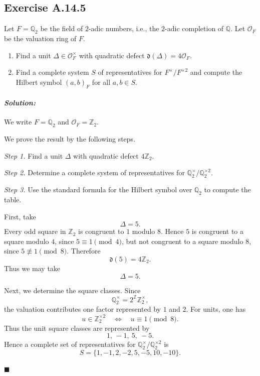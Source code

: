 \documentclass[12pt, a4paper]{article}
\newenvironment{solution}
  {\paragraph{\textit{Solution:}}\par\medskip}
  {\hfill$\blacksquare$\vspace{0.1cm}}
\begin{document}
\subsection*{Exercise A.14.5}
Let $F = \mathbb{Q}_2$ be the field of $2$-adic numbers, i.e., the $2$-adic completion of $\mathbb{Q}$. Let $\mathcal{O}_F$ be the valuation ring of $F$.
\begin{enumerate}
    \item Find a unit $\Delta \in \mathcal{O}_F^\times$ with quadratic defect $\mathfrak{d}(\Delta) = 4\mathcal{O}_F$.
    \item Find a complete system $S$ of representatives for $F^\times / F^{\times 2}$ and compute the Hilbert symbol $(a, b)_F$ for all $a, b \in S$.
\end{enumerate}
\begin{solution}
We write \(F=\mathbb Q_2\) and \(\mathcal O_F=\mathbb Z_2\).

We prove the result by the following steps.

\emph{Step 1.} Find a unit \(\Delta\) with quadratic defect \(4\mathbb Z_2\).

\emph{Step 2.} Determine a complete system of representatives for
\(\mathbb Q_2^\times/\mathbb Q_2^{\times 2}\).

\emph{Step 3.} Use the standard formula for the Hilbert symbol over
\(\mathbb Q_2\) to compute the table.

First, take
\[
\Delta=5.
\]
Every odd square in \(\mathbb Z_2\) is congruent to \(1\) modulo \(8\). Hence
\(5\) is congruent to a square modulo \(4\), since \(5\equiv 1\pmod 4\), but
not congruent to a square modulo \(8\), since \(5\not\equiv 1\pmod 8\).
Therefore
\[
\mathfrak d(5)=4\mathbb Z_2.
\]
Thus we may take
\[
\Delta=5.
\]

Next, we determine the square classes. Since
\[
\mathbb Q_2^\times=2^{\mathbb Z}\mathbb Z_2^\times,
\]
the valuation contributes one factor represented by \(1\) and \(2\). For units,
one has
\[
u\in \mathbb Z_2^{\times 2}
\quad\Longleftrightarrow\quad
u\equiv 1\pmod 8.
\]
Thus the unit square classes are represented by
\[
1,\ -1,\ 5,\ -5.
\]
Hence a complete set of representatives for
\(\mathbb Q_2^\times/\mathbb Q_2^{\times 2}\) is
\[
S=\{1,-1,2,-2,5,-5,10,-10\}.
\]


\end{solution}
\end{document}
